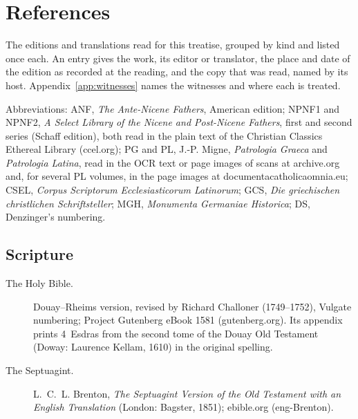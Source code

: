 \section{References}\label{app:references}

The editions and translations read for this treatise, grouped by kind and
listed once each. An entry gives the work, its editor or translator, the
place and date of the edition as recorded at the reading, and the copy
that was read, named by its host. Appendix~\ref{app:witnesses} names the
witnesses and where each is treated.

Abbreviations: ANF, \emph{The Ante-Nicene Fathers}, American edition;
NPNF1 and NPNF2, \emph{A Select Library of the Nicene and Post-Nicene
Fathers}, first and second series (Schaff edition), both read in the plain
text of the Christian Classics Ethereal Library (ccel.org); PG and PL,
J.-P. Migne, \emph{Patrologia Graeca} and \emph{Patrologia Latina}, read
in the OCR text or page images of scans at archive.org and, for several PL
volumes, in the page images at \mbox{documentacatholicaomnia.eu}; CSEL,
\emph{Corpus Scriptorum Ecclesiasticorum Latinorum}; GCS, \emph{Die
griechischen christlichen Schriftsteller}; MGH, \emph{Monumenta Germaniae
Historica}; DS, Denzinger's numbering.

\begingroup
\footnotesize
{}

\subsection*{Scripture}
\begin{description}
\item[The Holy Bible.] Douay--Rheims version, revised by Richard Challoner
  (1749--1752), Vulgate numbering; Project Gutenberg eBook 1581
  (gutenberg.org). Its appendix prints 4~Esdras from the
  second tome of the Douay Old Testament (Doway: Laurence Kellam, 1610) in
  the original spelling.
\item[The Septuagint.] L.~C.~L. Brenton, \emph{The Septuagint Version of
  the Old Testament with an English Translation} (London: Bagster, 1851);
  ebible.org (eng-Brenton).
\end{description}

